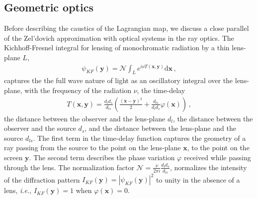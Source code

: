 \documentclass[a4paper, 11pt]{article}
\begin{document}
\subsection{Geometric optics}
Before describing the caustics of the Lagrangian map, we discuss a close parallel of the Zel'dovich approximation with optical systems in the ray optics. The Kichhoff-Fresnel integral for lensing of monochromatic radiation by a thin lens-plane $L$,
\begin{align}
\psi_{KF}(\bm{y}) =\mathcal{N} \int_L e^{i \nu T(\bm{x},\bm{y})}\mathrm{d}\bm{x}\,,
\end{align}
captures the the full wave nature of light as an oscillatory integral over the lens-plane, with the frequency of the radiation $\nu$, the time-delay 
\begin{align}
T(\bm{x},\bm{y}) =\frac{d_l d_s}{d_{ls}}\left( \frac{(\bm{x}-\bm{y})^2}{2} + \frac{d_{ls}}{d_ld_s}\varphi(\bm{x})\right)\,,
\end{align}
the distance between the observer and the lens-plane $d_l$, the distance between the observer and the source $d_s$, and the distance between the lens-plane and the source $d_{ls}$. The first term in the time-delay function captures the geometry of a ray passing from the source to the point on the lens-plane $\bm{x}$, to the point on the screen $\bm{y}$. The second term describes the phase variation $\varphi$ received while passing through the lens. The normalization factor $\mathcal{N} = \frac{\nu}{2 \pi i} \frac{d_l d_s}{d_{ls}}$, normalizes the intensity of the diffraction pattern $I_{KF}(\bm{y}) = |\psi_{KF}(\bm{y})|^2$ to unity in the absence of a lens, \textit{i.e.}, $I_{KF}(\bm{y})=1$ when $\varphi(\bm{x})=0$.
\end{document}
